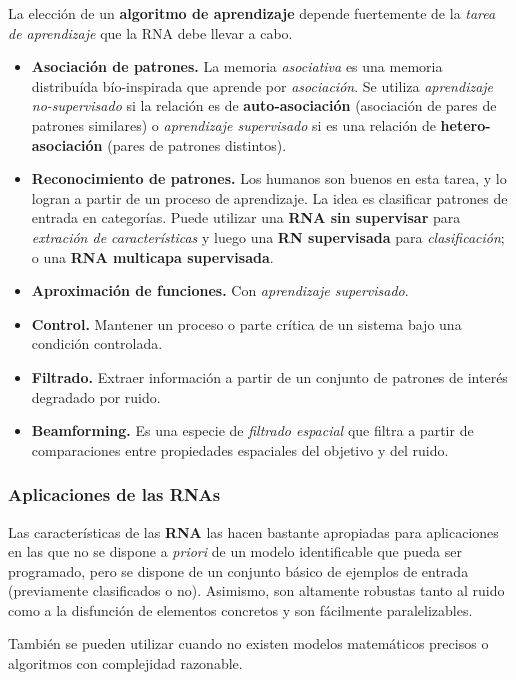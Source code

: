 \documentclass[10pt,a4paper]{article}
\begin{document}
La elección de un \textbf{algoritmo de aprendizaje} depende fuertemente de la \textit{tarea de aprendizaje} que la RNA debe llevar a cabo.
\begin{itemize}
\item \textbf{Asociación de patrones.} La memoria \textit{asociativa} es una memoria distribuída bío-inspirada que aprende por \textit{asociación}. Se utiliza \textit{aprendizaje no-supervisado} si la relación es de \textbf{auto-asociación} (asociación de pares de patrones similares) o \textit{aprendizaje supervisado} si es una relación de \textbf{hetero-asociación} (pares de patrones distintos).
\item \textbf{Reconocimiento de patrones.} Los humanos son buenos en esta tarea, y lo logran a partir de un proceso de aprendizaje. La idea es clasificar patrones de entrada en categorías. Puede utilizar una \textbf{RNA sin supervisar} para \textit{extración de características} y luego una \textbf{RN supervisada} para \textit{clasificación}; o una \textbf{RNA multicapa supervisada}.
\item \textbf{Aproximación de funciones.} Con \textit{aprendizaje supervisado}.
\item \textbf{Control.} Mantener un proceso o parte crítica de un sistema bajo una condición controlada.
\item \textbf{Filtrado.} Extraer información a partir de un conjunto de patrones de interés degradado por ruido.
\item \textbf{Beamforming.} Es una especie de \textit{filtrado espacial} que filtra a partir de comparaciones entre propiedades espaciales del objetivo y del ruido.
\end{itemize}

\subsubsection{Aplicaciones de las RNAs}

Las características de las \textbf{RNA} las hacen bastante apropiadas para aplicaciones en las que no se dispone a \textit{priori} de un modelo identificable que pueda ser programado, pero se dispone de un conjunto básico de ejemplos de entrada (previamente clasificados o no). Asimismo, son altamente robustas tanto al ruido como a la disfunción de elementos concretos y son fácilmente paralelizables.

También se pueden utilizar cuando no existen modelos matemáticos precisos o algoritmos con complejidad razonable. 
\end{document}
